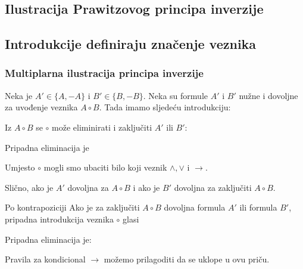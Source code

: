  
\begin{longsik}

\section*{Ilustracija Prawitzovog principa inverzije}
 \subsection*{Introdukcije definiraju značenje veznika}
\subsubsection*{Multiplarna ilustracija principa inverzije}
% 

Neka je $A'\in \{A, -A\}$ i $B'\in \{B, -B\}$.
Neka su formule $A'$ i $B'$ nužne i dovoljne za uvođenje veznika $A\circ B$. 
Tada imamo sljedeću introdukciju:
\begin{mathpar}
\end{mathpar}
Iz $A\circ B$ se $\circ$ može eliminirati  i zaključiti  $A'$ ili $B'$:
% 
Pripadna eliminacija je
 


Umjesto $\circ$ mogli smo ubaciti bilo koji veznik $\wedge, \vee$ i $\to$.


Slično, ako je $A'$ dovoljna za $A\circ B$ i ako je $B'$ dovoljna za zaključiti $A\circ B$.


Po kontrapoziciji 
Ako je za zaključiti $A\circ B$ dovoljna formula $A'$ ili formula $B'$, pripadna 
introdukcija veznika $\circ$ glasi
% 
Pripadna eliminacija je:
% 
\begin{mathpar}
\end{mathpar}

Pravila za kondicional $\to$ možemo prilagoditi da se uklope u ovu priču.
% 


\end{longsik}
